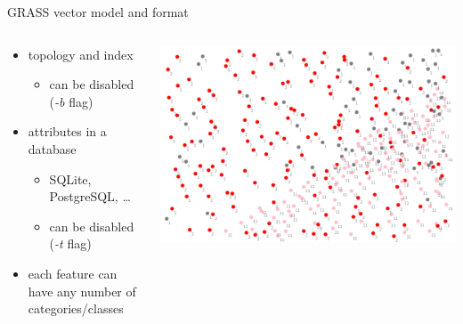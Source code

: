 \documentclass[xcolor={dvipsnames,usenames},beamer,aspectratio=169]{beamer}
\begin{document}
\begin{frame}{GRASS vector model and format}

\begin{columns}
\begin{column}{0.45\textwidth}

\begin{itemize}
  \item topology and index
  \begin{itemize}
    \item can be disabled (\textit{-b} flag)
  \end{itemize}
  \item attributes in a database
  \begin{itemize}
    \item SQLite, PostgreSQL, \ldots
    \item can be disabled (\textit{-t} flag)
  \end{itemize}
  \item each feature can have any number of categories/classes
\end{itemize}

\end{column}
\begin{column}{0.5\textwidth}

\begin{center}
\includegraphics[width=\textwidth]{features/class_as_cat}
\end{center}

\end{column}
\end{columns}

\end{frame}
\end{document}
